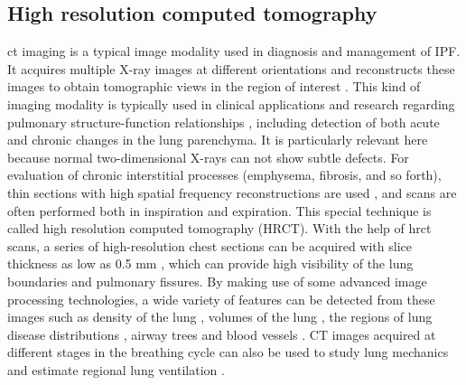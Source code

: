 \subsection{High resolution computed tomography}
\gls{ct} imaging is a typical image modality used in diagnosis and management of IPF. It acquires multiple X-ray images at different orientations and reconstructs these images to obtain tomographic views in the region of interest \citep{zhang2011medical}. This kind of imaging modality is typically used in clinical applications and research regarding pulmonary structure-function relationships \citep{hoffman1997assessment}, including detection of both acute and chronic changes in the lung parenchyma. It is particularly relevant here because normal two-dimensional X-rays can not show subtle  defects. For evaluation of chronic interstitial processes (emphysema, fibrosis, and so forth), thin sections with high spatial frequency reconstructions are used \citep{coxson2007computed}, and scans are often performed both in inspiration and expiration. This special technique is called high resolution computed tomography (HRCT). With the help of \gls{hrct} scans, a series of high-resolution chest sections can be acquired with slice thickness as low as 0.5 mm \citep{naidich2005imaging}, which can provide high visibility of the lung boundaries and pulmonary fissures.  By making use of some advanced image processing technologies, a wide variety of features can be detected from these images such as density of the lung \citep{coxson2007computed}, volumes of the lung \citep{hu2001automatic}, the regions of lung disease distributions \citep{el2013computer, ley2008quantitative}, airway trees \citep{graham2010robust, zhu2010automatic, diaz2010airway} and blood vessels \citep{shikata2009segmentation}. CT images acquired at different stages in the breathing cycle can also be used to study lung mechanics and estimate regional lung ventilation \citep{hoffman2006state, yamamoto2011investigation}.

